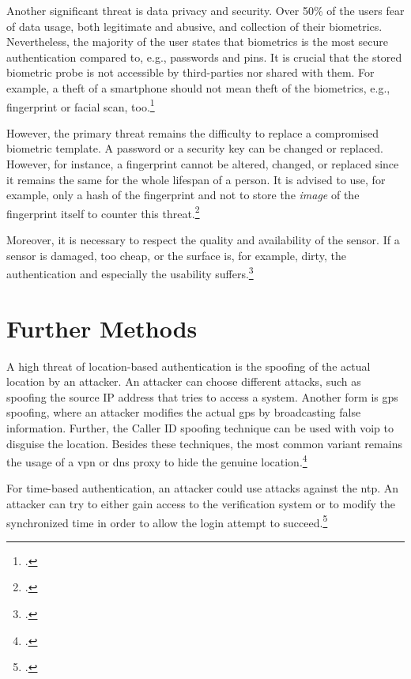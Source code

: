 Another significant threat is data privacy and security. Over 50\% of the users fear of data usage, both legitimate and abusive, and collection of their biometrics. Nevertheless, the majority of the user states that biometrics is the most secure authentication compared to, e.g., passwords and \glspl{pin}. It is crucial that the stored biometric probe is not accessible by third-parties nor shared with them. For example, a theft of a smartphone should not mean theft of the biometrics, e.g., fingerprint or facial scan, too.\footcites[See][8]{ibm-security}

However, the primary threat remains the difficulty to replace a compromised biometric template. A password or a security key can be changed or replaced. However, for instance, a fingerprint cannot be altered, changed, or replaced since it remains the same for the whole lifespan of a person. It is advised to use, for example, only a hash of the fingerprint and not to store the \textit{image} of the fingerprint itself to counter this threat.\footcites[See][266]{shostack2014threat}

Moreover, it is necessary to respect the quality and availability of the sensor. If a sensor is damaged, too cheap, or the surface is, for example, dirty, the authentication and especially the usability suffers.\footcites[See][37]{265831}

\section{Further Methods}

A high threat of location-based authentication is the spoofing of the actual location by an attacker. An attacker can choose different attacks, such as spoofing the source IP address that tries to access a system. Another form is \gls{gps} spoofing, where an attacker modifies the actual \gls{gps} by broadcasting false information. Further, the Caller ID spoofing technique can be used with \gls{voip} to disguise the location. Besides these techniques, the most common variant remains the usage of a \gls{vpn} or \gls{dns} proxy to hide the genuine location.\footcites[See][138--145]{517355}[See][Chapter 4.5.3]{30270}[See][115--116,133]{eckert-it-sec-9}

For time-based authentication, an attacker could use attacks against the \gls{ntp}. An attacker can try to either gain access to the verification system or to modify the synchronized time in order to allow the login attempt to succeed.\footcite[See][]{malhotraattacking}
